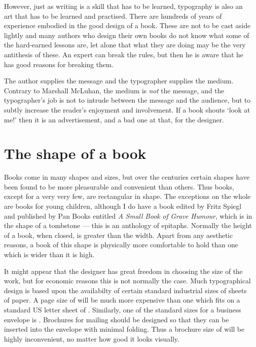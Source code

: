 \documentclass[10pt,letterpaper,extrafontsizes]{memoir}
\begin{document}
    However, just as writing is a skill that has to be learned, typography
is also an art that has to be learned and practised. There are hundreds
of years of experience embodied in the good design of a book. These are
not to be cast aside lightly and many authors who design their own books
do not know what some of the hard-earned lessons are, let alone that what
they are doing may be the very antithesis of these. An expert can break
the rules, but then he is aware that he has good reasons for breaking them.

    The author supplies the message and the typographer supplies the medium.
Contrary to Marshall McLuhan, the medium is \emph{not} the message, 
and the typographer's job is not to
intrude between the message and the audience, but to subtly increase the
reader's enjoyment and involvement. If a book shouts `look at me!' then it
is an advertisement, and a bad one at that, for the designer.


\section{The shape of a book}

    Books come in many shapes and sizes, but over the centuries certain
shapes have been found to be more pleasurable and convenient than others.
Thus books, except for a very very few, are rectangular in shape. The 
exceptions on the whole are books for young children, although I do
have a book edited by Fritz Spiegl and published by Pan Books entitled
\textit{A Small Book of Grave Humour}, which is in the shape of a tombstone
--- this is an anthology of epitaphs. Normally the height of a book, when 
closed, is greater than the width. Apart from any aesthetic reasons, 
a book of this shape is physically more comfortable to hold than one which 
is wider than it is high.

    It might appear that the designer has great freedom in choosing the
size of the work, but for economic reasons this is not normally the case.
Much typographical design is based upon the availabilty of certain 
standard industrial sizes of sheets of paper. 
A page size of  will be much more expensive than one 
which fits on a standard
US letter sheet 
of . 
Similarly, one of the standard sizes
for a business envelope is . 
Brochures for mailing
should be designed so that they can be inserted into the envelope with 
minimal folding. Thus a brochure size of  will be 
highly inconvenient, no matter how good it looks visually.
\end{document}
